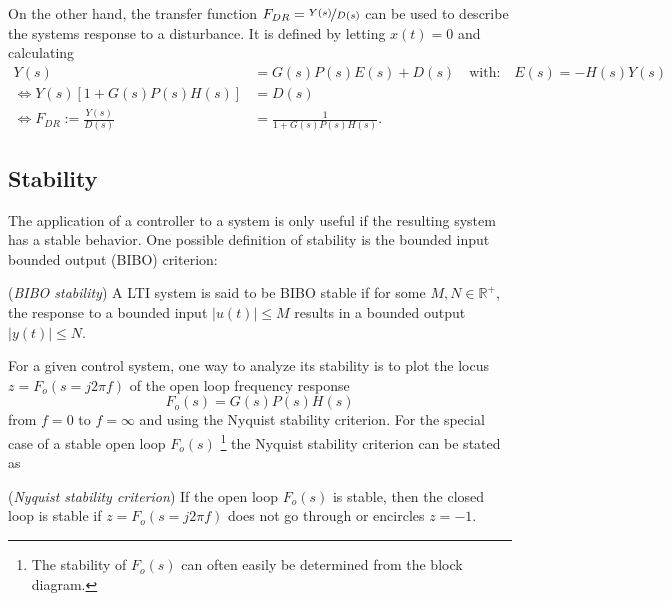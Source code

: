 On the other hand, the transfer function $F_{DR}=\nicefrac{Y(s)}{D(s)}$ can be used to describe the systems response to a disturbance.\cite[p.~88]{Foellinger2016} It is defined by letting $x(t)=0$ and calculating
\begin{align}\label{eq:disturbanceRejection}
Y(s)&=G(s)P(s)E(s)+D(s)\quad\text{with:}\quad E(s)=-H(s)Y(s)\\
\Leftrightarrow Y(s)\left[1+G(s)P(s)H(s)\right]&=D(s)\\
\Leftrightarrow F_{DR}:=\frac{Y(s)}{D(s)}&=\frac{1}{1+G(s)P(s)H(s)}.
\end{align}

\subsection{Stability}
The application of a controller to a system is only useful if the resulting system has a stable behavior.
One possible definition of stability is the bounded input bounded output (BIBO) criterion\cite[p.~82]{Foellinger2016}:
\begin{definition}\label{def:bibo}
(\textit{BIBO stability}) A LTI system is said to be BIBO stable if for some $M,N \in \mathbb{R}^+$, the response to a bounded input $|u(t)| \le M$ results in a bounded output $|y(t)| \le N$.
\end{definition}

For a given control system, one way to analyze its stability is to plot the locus $z=F_o(s=j2\pi f)$ of the open loop frequency response
\begin{equation}
F_o(s) = G(s)P(s)H(s)
\end{equation}
from $f=0$ to $f=\infty$ and using the Nyquist stability criterion.
For the special case of a stable open loop $F_o(s)$ \footnote{The stability of $F_o(s)$ can often easily be determined from the block diagram.} the Nyquist stability criterion can be stated as\cite[p.~111]{Foellinger2016}
\begin{definition}\label{def:Nyquist}
(\textit{Nyquist stability criterion}) If the open loop $F_o(s)$ is stable, then the closed loop is stable if $z=F_o(s=j2\pi f)$ does not go through or encircles $z=-1$.
\end{definition}

